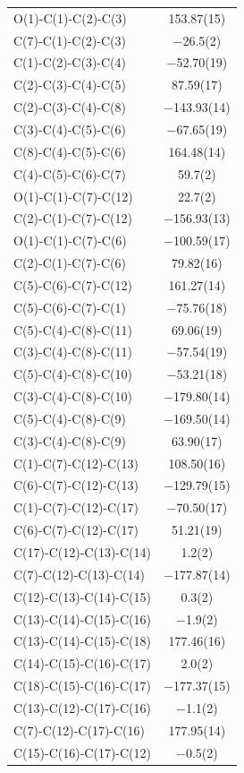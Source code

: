 \begin{center}
\tablefirsthead{%
\toprule}
\tablelasttail{\bottomrule}
{\footnotesize \singlespacing
\begin{supertabular}{p{1.5in}c}
O(1)-C(1)-C(2)-C(3)&	153.87(15) \\
C(7)-C(1)-C(2)-C(3)&	$-$26.5(2) \\
C(1)-C(2)-C(3)-C(4)&	$-$52.70(19) \\
C(2)-C(3)-C(4)-C(5)&	87.59(17) \\
C(2)-C(3)-C(4)-C(8)&	$-$143.93(14) \\
C(3)-C(4)-C(5)-C(6)&	$-$67.65(19) \\
C(8)-C(4)-C(5)-C(6)&	164.48(14) \\
C(4)-C(5)-C(6)-C(7)&	59.7(2) \\
O(1)-C(1)-C(7)-C(12)&	22.7(2) \\
C(2)-C(1)-C(7)-C(12)&	$-$156.93(13) \\
O(1)-C(1)-C(7)-C(6)&	$-$100.59(17) \\
C(2)-C(1)-C(7)-C(6)&	79.82(16) \\
C(5)-C(6)-C(7)-C(12)&	161.27(14) \\
C(5)-C(6)-C(7)-C(1)&	$-$75.76(18) \\
C(5)-C(4)-C(8)-C(11)&	69.06(19) \\
C(3)-C(4)-C(8)-C(11)&	$-$57.54(19) \\
C(5)-C(4)-C(8)-C(10)&	$-$53.21(18) \\
C(3)-C(4)-C(8)-C(10)&	$-$179.80(14) \\
C(5)-C(4)-C(8)-C(9)&	$-$169.50(14) \\
C(3)-C(4)-C(8)-C(9)&	63.90(17) \\
C(1)-C(7)-C(12)-C(13)&	108.50(16) \\
C(6)-C(7)-C(12)-C(13)&	$-$129.79(15) \\
C(1)-C(7)-C(12)-C(17)&	$-$70.50(17) \\
C(6)-C(7)-C(12)-C(17)&	51.21(19) \\
C(17)-C(12)-C(13)-C(14)&	1.2(2) \\
C(7)-C(12)-C(13)-C(14)&	$-$177.87(14) \\
C(12)-C(13)-C(14)-C(15)&	0.3(2) \\
C(13)-C(14)-C(15)-C(16)&	$-$1.9(2) \\
C(13)-C(14)-C(15)-C(18)&	177.46(16) \\
C(14)-C(15)-C(16)-C(17)&	2.0(2) \\
C(18)-C(15)-C(16)-C(17)&	$-$177.37(15) \\
C(13)-C(12)-C(17)-C(16)&	$-$1.1(2) \\
C(7)-C(12)-C(17)-C(16)&	177.95(14) \\
C(15)-C(16)-C(17)-C(12)&	$-$0.5(2) \\
\end{supertabular}
}
\end{center}





